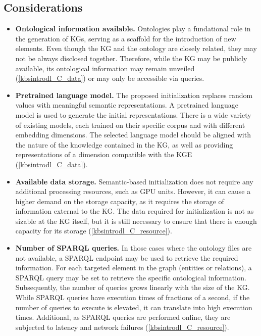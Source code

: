 \subsection{Considerations}
\begin{itemize}
    \item \textbf{Ontological information available.} Ontologies play a fundational role in the generation of KGs, serving as a scaffold for the introduction of new elements. Even though the KG and the ontology are closely related, they may not be always disclosed together. Therefore, while the KG may be publicly available, its ontological information may remain unveiled (\ref{kbsintrodl_C_data}) or may only be accessible via queries.
    
    \item \textbf{Pretrained language model.} The proposed initialization replaces random values with meaningful semantic representations. A pretrained language model is used to generate the initial representations. There is a wide variety of existing models, each trained on their specific corpus and with different embedding dimensions. The selected language model should be aligned with the nature of the knowledge contained in the KG, as well as providing representations of a dimension compatible with the KGE (\ref{kbsintrodl_C_data}).
    
    \item \textbf{Available data storage.} Semantic-based initialization does not require any additional processing resources, such as GPU units. However, it can cause a higher demand on the storage capacity, as it requires the storage of information external to the KG. The data required for initialization is not as sizable at the KG itself, but it is still necessary to ensure that there is enough capacity for its storage (\ref{kbsintrodl_C_resource}).
    
    \item \textbf{Number of SPARQL queries.} In those cases where the ontology files are not available, a SPARQL endpoint may be used to retrieve the required information. For each targeted element in the graph (entities or relations), a SPARQL query may be set to retrieve the specific ontological information. Subsequently, the number of queries grows linearly with the size of the KG. While SPARQL queries have execution times of fractions of a second, if the number of queries to execute is elevated, it can translate into high execution times. Additional, as SPARQL queries are performed online, they are subjected to latency and network failures (\ref{kbsintrodl_C_resource}). 
\end{itemize}
